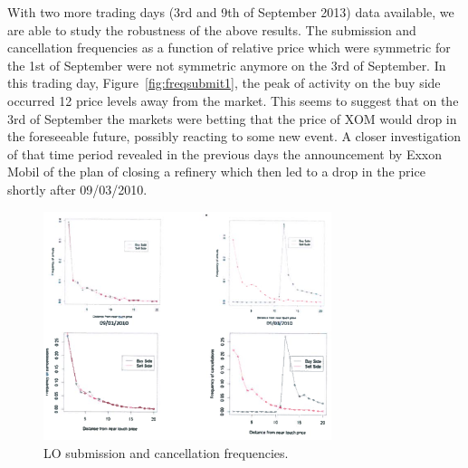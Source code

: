 With two more trading days (3rd and 9th of September 2013) data available, we are able to study the robustness of the above results. The submission and cancellation frequencies as a function of relative price which were symmetric for the 1st of September were not symmetric anymore on the 3rd of September. In this trading day, Figure~\ref{fig:freqsubmit1}, the peak of activity on the buy side occurred 12 price levels away from the market. This seems to suggest that on the 3rd of September the markets were betting that the price of XOM would drop in the foreseeable future, possibly reacting to some new event. A closer investigation of that time period revealed in the previous days the announcement by Exxon Mobil of the plan of closing a refinery which then led to a drop in the price shortly after 09/03/2010.
	\begin{figure}[!ht]
   	\centering
   	\includegraphics[width=0.75\textwidth]{chapters/chapter_trade_data_models/figures/losubcanfreq.png} 
   	\caption{LO submission and cancellation frequencies. \label{fig:losubcanfreq}}
	\end{figure}


